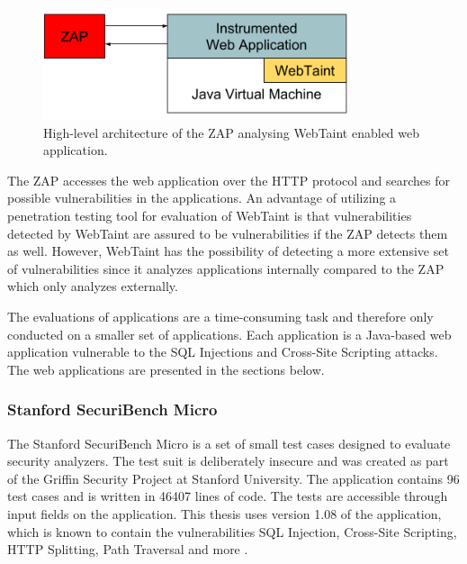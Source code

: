 \begin{figure}[H]
    \centering
    \includegraphics[width=0.8\textwidth]{images/ZAPArchitecture.png}
    \caption{High-level architecture of the ZAP analysing WebTaint enabled web application.}
    \label{fig:ZAP}
\end{figure}

The ZAP accesses the web application over the HTTP protocol and searches for possible vulnerabilities in the applications. An advantage of utilizing a penetration testing tool for evaluation of WebTaint is that vulnerabilities detected by WebTaint are assured to be vulnerabilities if the ZAP detects them as well. However, WebTaint has the possibility of detecting a more extensive set of vulnerabilities since it analyzes applications internally compared to the ZAP which only analyzes externally.

The evaluations of applications are a time-consuming task and therefore only conducted on a smaller set of applications. Each application is a Java-based web application vulnerable to the SQL Injections and Cross-Site Scripting attacks. The web applications are presented in the sections below.



\subsubsection{Stanford SecuriBench Micro}
The Stanford SecuriBench Micro is a set of small test cases designed to evaluate security analyzers. The test suit is deliberately insecure and was created as part of the Griffin Security Project \parencite{griffin} at Stanford University. The application contains 96 test cases and is written in 46407 lines of code. The tests are accessible through input fields on the application. This thesis uses version 1.08 of the application, which is known to contain the vulnerabilities SQL Injection, Cross-Site Scripting, HTTP Splitting, Path Traversal and more \parencite{securiBenchMicro, microfaq}. 



